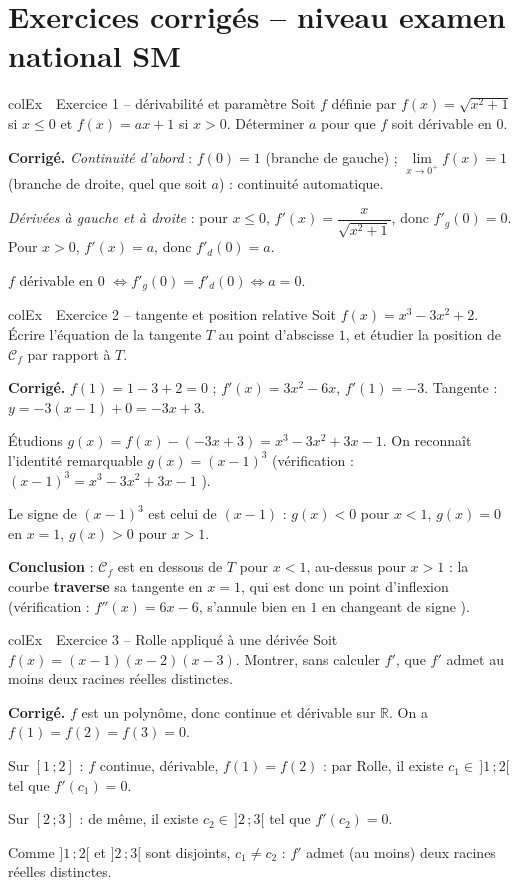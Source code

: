 \documentclass[11pt,a4paper]{article}
\newenvironment{exemple}[1][Exemple]
  {\begin{fiche}{colEx}{\ding{217}~~#1}}{\end{fiche}}
\begin{document}
\section{Exercices corrigés -- niveau examen national SM}

\begin{exemple}[Exercice 1 -- dérivabilité et paramètre]
Soit $f$ définie par $f(x) = \sqrt{x^2 + 1}$ si $x \leq 0$ et $f(x) = ax + 1$ si $x > 0$. Déterminer $a$ pour que $f$ soit dérivable en $0$.

\smallskip
\textbf{Corrigé.} \emph{Continuité d'abord} : $f(0) = 1$ (branche de gauche) ; $\lim\limits_{x \to 0^+} f(x) = 1$ (branche de droite, quel que soit $a$) : continuité automatique.

\smallskip
\emph{Dérivées à gauche et à droite} : pour $x \leq 0$, $f'(x) = \dfrac{x}{\sqrt{x^2+1}}$, donc $f'_g(0) = 0$. Pour $x > 0$, $f'(x) = a$, donc $f'_d(0) = a$.

\smallskip
$f$ dérivable en $0$ $\iff f'_g(0) = f'_d(0) \iff a = 0$.
\end{exemple}

\begin{exemple}[Exercice 2 -- tangente et position relative]
Soit $f(x) = x^3 - 3x^2 + 2$. Écrire l'équation de la tangente $T$ au point d'abscisse $1$, et étudier la position de $\mathcal{C}_f$ par rapport à $T$.

\smallskip
\textbf{Corrigé.} $f(1) = 1 - 3 + 2 = 0$ ; $f'(x) = 3x^2 - 6x$, $f'(1) = -3$. Tangente : $y = -3(x-1) + 0 = -3x + 3$.

\smallskip
Étudions $g(x) = f(x) - (-3x + 3) = x^3 - 3x^2 + 3x - 1$. On reconnaît l'identité remarquable $g(x) = (x - 1)^3$ (vérification : $(x-1)^3 = x^3 - 3x^2 + 3x - 1$ \checkmark).

\smallskip
Le signe de $(x-1)^3$ est celui de $(x - 1)$ : $g(x) < 0$ pour $x < 1$, $g(x) = 0$ en $x=1$, $g(x) > 0$ pour $x > 1$.

\smallskip
\textbf{Conclusion} : $\mathcal{C}_f$ est en dessous de $T$ pour $x < 1$, au-dessus pour $x > 1$ : la courbe \textbf{traverse} sa tangente en $x=1$, qui est donc un point d'inflexion (vérification : $f''(x) = 6x - 6$, s'annule bien en $1$ en changeant de signe \checkmark).
\end{exemple}

\begin{exemple}[Exercice 3 -- Rolle appliqué à une dérivée]
Soit $f(x) = (x-1)(x-2)(x-3)$. Montrer, sans calculer $f'$, que $f'$ admet au moins deux racines réelles distinctes.

\smallskip
\textbf{Corrigé.} $f$ est un polynôme, donc continue et dérivable sur $\mathbb{R}$. On a $f(1) = f(2) = f(3) = 0$.

\smallskip
Sur $[1\,;2]$ : $f$ continue, dérivable, $f(1) = f(2)$ : par Rolle, il existe $c_1 \in\, ]1\,;2[$ tel que $f'(c_1) = 0$.

\smallskip
Sur $[2\,;3]$ : de même, il existe $c_2 \in\, ]2\,;3[$ tel que $f'(c_2) = 0$.

\smallskip
Comme $]1\,;2[$ et $]2\,;3[$ sont disjoints, $c_1 \neq c_2$ : $f'$ admet (au moins) deux racines réelles distinctes.
\end{exemple}
\end{document}
